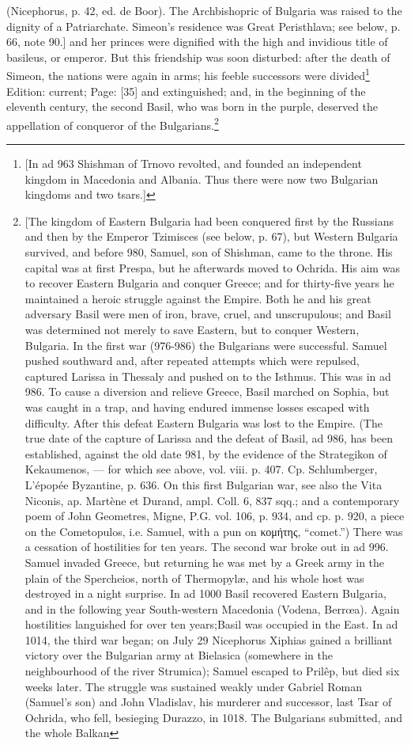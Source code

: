 {(Nicephorus, p. 42, ed. de Boor). The Archbishopric of Bulgaria was raised to the dignity of a Patriarchate. Simeon\texthebrew{}’s residence was Great Peristhlava; see below, p. 66, note 90.]} and her princes were dignified with the high and invidious title of basileus, or emperor. But this friendship was soon disturbed: after the death of Simeon, the nations were again in arms; his feeble successors were divided\footnote{[In ad 963 Shishman of Trnovo revolted, and founded an independent kingdom in Macedonia and Albania. Thus there were now two Bulgarian kingdoms and two tsars.]} Edition: current; Page: [35] and extinguished; and, in the beginning of the eleventh century, the second Basil, who was born in the purple, deserved the appellation of conqueror of the Bulgarians.\footnote{[The kingdom of Eastern Bulgaria had been conquered first by the Russians and then by the Emperor Tzimisces (see below, p. 67), but Western Bulgaria survived, and before 980, Samuel, son of Shishman, came to the throne. His capital was at first Prespa, but he afterwards moved to Ochrida. His aim was to recover Eastern Bulgaria and conquer Greece; and for thirty-five years he maintained a heroic struggle against the Empire. Both he and his great adversary Basil were men of iron, brave, cruel, and unscrupulous; and Basil was determined not merely to save Eastern, but to conquer Western, Bulgaria. In the first war (976-986) the Bulgarians were successful. Samuel pushed southward and, after repeated attempts which were repulsed, captured Larissa in Thessaly and pushed on to the Isthmus. This was in ad 986. To cause a diversion and relieve Greece, Basil marched on Sophia, but was caught in a trap, and having endured immense losses escaped with difficulty. After this defeat Eastern Bulgaria was lost to the Empire. (The true date of the capture of Larissa and the defeat of Basil, ad 986, has been established, against the old date 981, by the evidence of the Strategikon of Kekaumenos, \texthebrew{—} for which see above, vol. viii. p. 407. Cp. Schlumberger, L\texthebrew{}’épopée Byzantine, p. 636. On this first Bulgarian war, see also the Vita Niconis, ap. Martène et Durand, ampl. Coll. 6, 837 sqq.; and a contemporary poem of John Geometres, Migne, P.G. vol. 106, p. 934, and cp. p. 920, a piece on the Cometopulos, i.e. Samuel, with a pun on \textgreek{κομήτης}, \texthebrew{“}comet.\texthebrew{}”) There was a cessation of hostilities for ten years. The second war broke out in ad 996. Samuel invaded Greece, but returning he was met by a Greek army in the plain of the Spercheios, north of Thermopylæ, and his whole host was destroyed in a night surprise. In ad 1000 Basil recovered Eastern Bulgaria, and in the following year South-western Macedonia (Vodena, Berrœa). Again hostilities languished for over ten years;Basil was occupied in the East. In ad 1014, the third war began; on July 29 Nicephorus Xiphias gained a brilliant victory over the Bulgarian army at Bielasica (somewhere in the neighbourhood of the river Strumica); Samuel escaped to Prilêp, but died six weeks later. The struggle was sustained weakly under Gabriel Roman (Samuel\texthebrew{}’s son) and John Vladislav, his murderer and successor, last Tsar of Ochrida, who fell, besieging Durazzo, in 1018. The Bulgarians submitted, and the whole Balkan }

